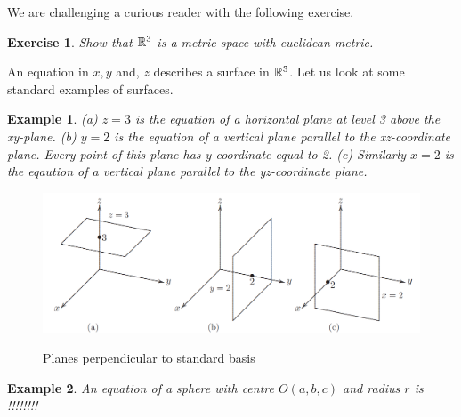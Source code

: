\documentclass[12pt]{article}
\newtheorem{exercise}{Exercise}[section]
\newtheorem{example}{Example}[section]
\begin{document}
We are challenging a curious reader with the following exercise.

\begin{exercise}
  Show that $\mathbb{R}^3$ is a metric space with euclidean metric.
\end{exercise}

An equation in $x,y$ and, $z$ describes a surface in $\mathbb{R}^3$. Let us look at some 
standard examples of surfaces.

\begin{example}
(a) $z = 3$ is the equation of a horizontal plane at level 3 above the xy-plane.
(b) $y = 2 $ is the equation of a vertical plane parallel to the xz-coordinate plane. Every point of
this plane has y coordinate equal to 2. (c) Similarly $x = 2$ is the eqaution of a vertical plane
parallel to the yz-coordinate plane.
\end{example}

\begin{center}
  \begin{figure}[h]
    \centering
    \includegraphics[width=.8\linewidth]{figures/fig2.png}
    \label{fig:2}
    \caption{Planes perpendicular to standard basis}
  \end{figure}
\end{center}

\begin{example}
  An equation of a sphere with centre $O(a, b, c)$ and radius $r$ is !!!!!!!!
\end{example}
\end{document}
